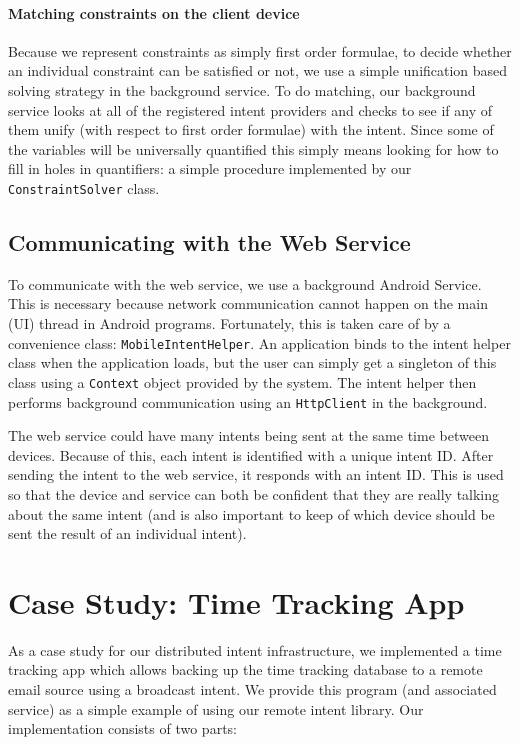 \documentclass{acm_proc_article-sp}
\begin{document}
\paragraph{Matching constraints on the client device}

Because we represent constraints as simply first order formulae, to
decide whether an individual constraint can be satisfied or not, we
use a simple unification based solving strategy in the background
service.  To do matching, our background service looks at all of the
registered intent providers and checks to see if any of them unify
(with respect to first order formulae) with the intent.  Since some of
the variables will be universally quantified this simply means looking
for how to fill in holes in quantifiers: a simple procedure
implemented by our \texttt{ConstraintSolver} class.

\subsection{Communicating with the Web Service} 

To communicate with the web service, we use a background Android
Service.  This is necessary because network communication cannot
happen on the main (UI) thread in Android programs.  Fortunately, this
is taken care of by a convenience class: \texttt{MobileIntentHelper}.
An application binds to the intent helper class when the application
loads, but the user can simply get a singleton of this class using a
\texttt{Context} object provided by the system.  The intent helper
then performs background communication using an \texttt{HttpClient} in
the background.

The web service could have many intents being sent at the same time
between devices.  Because of this, each intent is identified with a
unique intent ID.  After sending the intent to the web service, it
responds with an intent ID.  This is used so that the device and
service can both be confident that they are really talking about the
same intent (and is also important to keep of which device should be
sent the result of an individual intent).

\section{Case Study: Time Tracking App}
\label{section:case-study}

As a case study for our distributed intent infrastructure, we
implemented a time tracking app which allows backing up the time
tracking database to a remote email source using a broadcast intent.
We provide this program (and associated service) as a simple example
of using our remote intent library.  Our implementation consists of
two parts:
\end{document}
